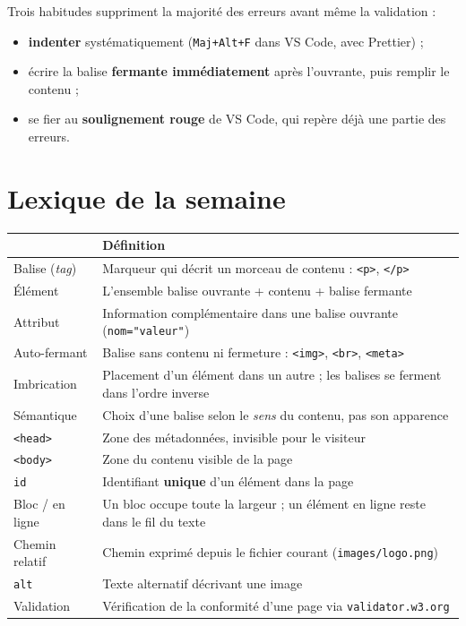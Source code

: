 \documentclass[a4paper,11pt]{article}
\newcommand{\hdr}[1]{\multicolumn{1}{l}{\color{white}\bfseries #1}}
\renewcommand{\arraystretch}{1.3}
\begin{document}
\begin{tcolorbox}[astuce, title={Prévenir plutôt que corriger}]
Trois habitudes suppriment la majorité des erreurs avant même la validation :
\begin{itemize}
  \item \textbf{indenter} systématiquement (\texttt{Maj+Alt+F} dans VS Code, avec Prettier) ;
  \item écrire la balise \textbf{fermante immédiatement} après l'ouvrante, puis remplir le contenu ;
  \item se fier au \textbf{soulignement rouge} de VS Code, qui repère déjà une partie des erreurs.
\end{itemize}
\end{tcolorbox}

\section{Lexique de la semaine}

\begin{center}
\renewcommand{\arraystretch}{1.0}
\begin{tabularx}{\linewidth}{p{4cm}X}
  \toprule
  \rowcolor{uniNavy}
  \hdr{Terme} & \hdr{Définition} \\
  \midrule
  \rowcolor{uniPaper}
  Balise (\textit{tag}) & Marqueur qui décrit un morceau de contenu : \texttt{<p>}, \texttt{</p>} \\
  Élément & L'ensemble balise ouvrante + contenu + balise fermante \\
  \rowcolor{uniPaper}
  Attribut & Information complémentaire dans une balise ouvrante (\texttt{nom="valeur"}) \\
  Auto-fermant & Balise sans contenu ni fermeture : \texttt{<img>}, \texttt{<br>}, \texttt{<meta>} \\
  \rowcolor{uniPaper}
  Imbrication & Placement d'un élément dans un autre ; les balises se ferment dans l'ordre inverse \\
  Sémantique & Choix d'une balise selon le \textit{sens} du contenu, pas son apparence \\
  \rowcolor{uniPaper}
  \texttt{<head>} & Zone des métadonnées, invisible pour le visiteur \\
  \texttt{<body>} & Zone du contenu visible de la page \\
  \rowcolor{uniPaper}
  \texttt{id} & Identifiant \textbf{unique} d'un élément dans la page \\
  Bloc / en ligne & Un bloc occupe toute la largeur ; un élément en ligne reste dans le fil du texte \\
  \rowcolor{uniPaper}
  Chemin relatif & Chemin exprimé depuis le fichier courant (\texttt{images/logo.png}) \\
  \texttt{alt} & Texte alternatif décrivant une image \\
  \rowcolor{uniPaper}
  Validation & Vérification de la conformité d'une page via \texttt{validator.w3.org} \\
  \bottomrule
\end{tabularx}
\end{center}
\end{document}
